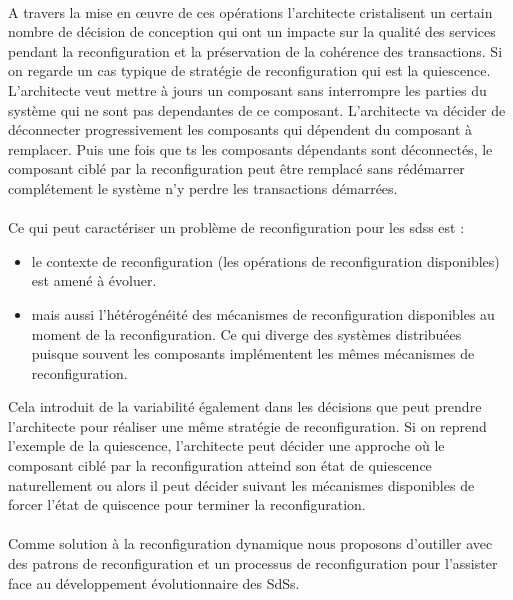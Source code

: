 \paragraph{}
A travers la mise en \oe{}uvre
de ces opérations l'architecte cristalisent un certain nombre de
décision de conception qui ont un impacte sur la qualité des services
pendant la reconfiguration et la préservation de la cohérence des
transactions. 
%
Si on regarde un cas typique de stratégie de
reconfiguration qui est la quiescence. L'architecte veut mettre à
jours un composant sans interrompre les parties du système qui ne sont
pas dependantes de ce composant. L'architecte va décider de déconnecter
progressivement les composants qui dépendent du composant à
remplacer. Puis une fois que ts les composants dépendants sont
déconnectés, le composant ciblé par la reconfiguration peut être
remplacé sans rédémarrer complétement le système n'y perdre les
transactions démarrées.


\paragraph{} 
Ce qui peut caractériser un problème de reconfiguration pour les sdss
est : 
\begin{itemize}
\item le contexte de reconfiguration (les opérations de
reconfiguration disponibles) est amené à évoluer. 
\item mais aussi l'hétérogénéité des mécanismes de reconfiguration disponibles au
moment de la reconfiguration. Ce qui diverge des systèmes distribuées
puisque souvent les composants implémentent les mêmes mécanismes de
reconfiguration. 
\end{itemize}
%
Cela introduit de la variabilité également dans les
décisions que peut prendre l'architecte pour réaliser une même
stratégie de reconfiguration. Si on reprend l'exemple de la
quiescence, l'architecte peut décider une approche où le composant
ciblé par la reconfiguration atteind son état de quiescence
naturellement ou alors il peut décider suivant les mécanismes
disponibles de forcer l'état de quiscence pour terminer la
reconfiguration. 

\paragraph{} 
Comme solution à la reconfiguration dynamique nous proposons
d'outiller avec des patrons de reconfiguration et un processus de
reconfiguration pour l'assister face au développement
évolutionnaire des SdSs. 

